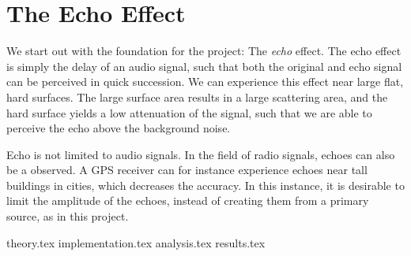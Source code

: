 
\section{The Echo Effect}
We start out with the foundation for the project: The \emph{echo} effect. The echo effect is simply the delay of an audio signal, such that both the original and echo signal can be perceived in quick succession. We can experience this effect near large flat, hard surfaces. The large surface area results in a large scattering area, and the hard surface yields a low attenuation of the signal, such that we are able to perceive the echo above the background noise.

Echo is not limited to audio signals. In the field of radio signals, echoes can also be a observed. A GPS receiver can for instance experience echoes near tall buildings in cities, which decreases the accuracy. In this instance, it is desirable to limit the amplitude of the echoes, instead of creating them from a primary source, as in this project.

{theory.tex}
{implementation.tex}
{analysis.tex}
{results.tex}
